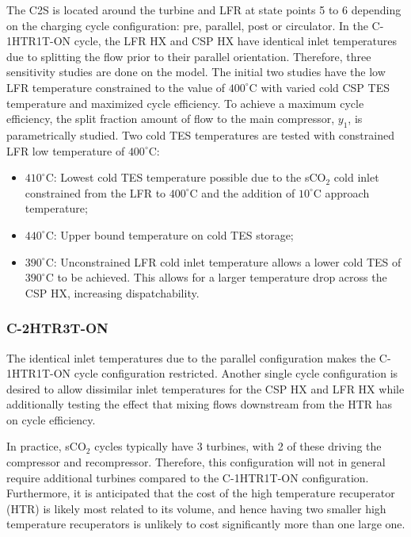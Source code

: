 \begin{paracol}{2}
\linenumbers
\switchcolumn

The C2S is located around the turbine and LFR at state points 5 to 6 depending on the charging cycle configuration: pre, parallel, post or circulator. In the C-1HTR1T-ON cycle, the LFR HX and CSP HX have identical inlet temperatures due to splitting the flow prior to their parallel orientation. Therefore, three sensitivity studies are done on the model. The initial two studies have the low LFR temperature constrained to the value of $400^{\circ}$C with varied cold CSP TES temperature and maximized cycle efficiency. To achieve a maximum cycle efficiency, the split fraction amount of flow to the main compressor, $y_{1}$, is parametrically studied.
Two cold TES temperatures are tested with constrained LFR low temperature of $400^{\circ}$C: 
\begin{itemize}
    \item	$410^{\circ}$C: Lowest cold TES temperature possible due to the sCO$_2$ cold inlet constrained from the LFR to $400^{\circ}$C and the addition of $10^{\circ}$C approach temperature;
    \item	$440^{\circ}$C: Upper bound temperature on cold TES storage;
    \item	$390^{\circ}$C: Unconstrained LFR cold inlet temperature allows a lower cold TES of $390^{\circ}$C to be achieved. This allows for a larger temperature drop across the CSP HX, increasing dispatchability.
\end{itemize}


\subsubsection{C-2HTR3T-ON} 

The identical inlet temperatures due to the parallel configuration makes the C-1HTR1T-ON cycle configuration restricted. Another single cycle configuration is desired to allow dissimilar inlet temperatures for the CSP HX and LFR HX while additionally testing the effect that mixing flows downstream from the HTR has on cycle efficiency. 

In practice, sCO$_2$ cycles typically have 3 turbines, with 2 of these driving the compressor and recompressor. Therefore, this configuration will not in general require additional turbines compared to the C-1HTR1T-ON configuration. Furthermore, it is anticipated that the cost of the high temperature recuperator (HTR) is likely most related to its volume, and hence having two smaller high temperature recuperators is unlikely to cost significantly more than one large one. 


\end{paracol}
